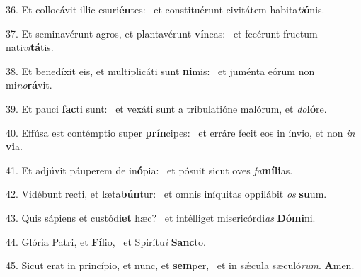 36. Et collocávit illic esuri\textbf{én}tes: \ast\  et constituérunt civitátem habita\textit{ti}\textbf{ó}nis.\

37. Et seminavérunt agros, et plantavérunt \textbf{ví}neas: \ast\  et fecérunt fructum nati\textit{vi}\textbf{tá}tis.\

38. Et benedíxit eis, et multiplicáti sunt \textbf{ni}mis: \ast\  et juménta eórum non mi\textit{no}\textbf{rá}vit.\

39. Et pauci \textbf{fac}ti sunt: \ast\  et vexáti sunt a tribulatióne malórum, et \textit{do}\textbf{ló}re.\

40. Effúsa est contémptio super \textbf{prín}cipes: \ast\  et erráre fecit eos in ínvio, et non \textit{in} \textbf{vi}a.\

41. Et adjúvit páuperem de in\textbf{ó}pia: \ast\  et pósuit sicut oves \textit{fa}\textbf{mí}\textbf{li}as.\

42. Vidébunt recti, et læta\textbf{bún}tur: \ast\  et omnis iníquitas oppilábit \textit{os} \textbf{su}um.\

43. Quis sápiens et custódi\textbf{et} hæc? \ast\  et intélliget misericórdi\textit{as} \textbf{Dó}\textbf{mi}ni.\

44. Glória Patri, et \textbf{Fí}lio, \ast\  et Spirítu\textit{i} \textbf{Sanc}to.\

45. Sicut erat in princípio, et nunc, et \textbf{sem}per, \ast\  et in sǽcula sæculó\textit{rum}. \textbf{A}men.\

